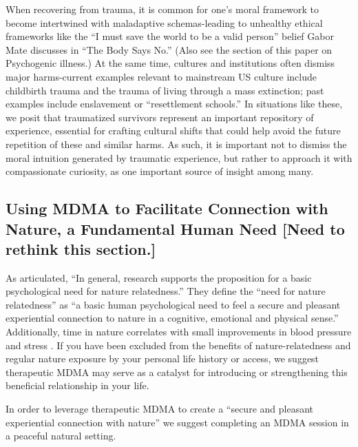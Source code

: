 \documentclass[12pt,letterpaper]{book}
\begin{document}
When recovering from trauma, it is common for one's moral framework to become intertwined with maladaptive schemas-leading to unhealthy ethical frameworks like the “I must save the world to be a valid person” belief Gabor Mate discusses in “The Body Says No.” (Also see the section\todo{} of this paper on Psychogenic illness.) At the same time, cultures and institutions often dismiss major harms-current examples relevant to mainstream US culture include childbirth trauma and the trauma of living through a mass extinction; past examples include enslavement or “resettlement schools.” In situations like these, we posit that traumatized survivors represent an important repository of experience, essential for crafting cultural shifts that could help avoid the future repetition of these and similar harms. As such, it is important not to dismiss the moral intuition generated by traumatic experience, but rather to approach it with compassionate curiosity, as one important source of insight among many. 

\subsection{Using MDMA to Facilitate Connection with Nature, a Fundamental Human Need [Need to rethink this section.]}
\label{sec:nature}
As \textcite{baxterNatureRelatedness} articulated, “In general, research supports the proposition for a basic psychological need for nature relatedness.” They define the “need for nature relatedness” as “a basic human psychological need to feel a secure and pleasant experiential connection to nature in a cognitive, emotional and physical sense.” Additionally, time in nature correlates with small improvements in blood pressure and stress \cite{caoimheGreenspaceOutcomes}. If you have been excluded from the benefits of nature-relatedness and regular nature exposure by your personal life history or access, we suggest therapeutic MDMA may serve as a catalyst for introducing or strengthening this beneficial relationship in your life.

In order to leverage therapeutic MDMA to create a “secure and pleasant experiential connection with nature” we suggest completing an MDMA session in a peaceful natural setting.
\end{document}
